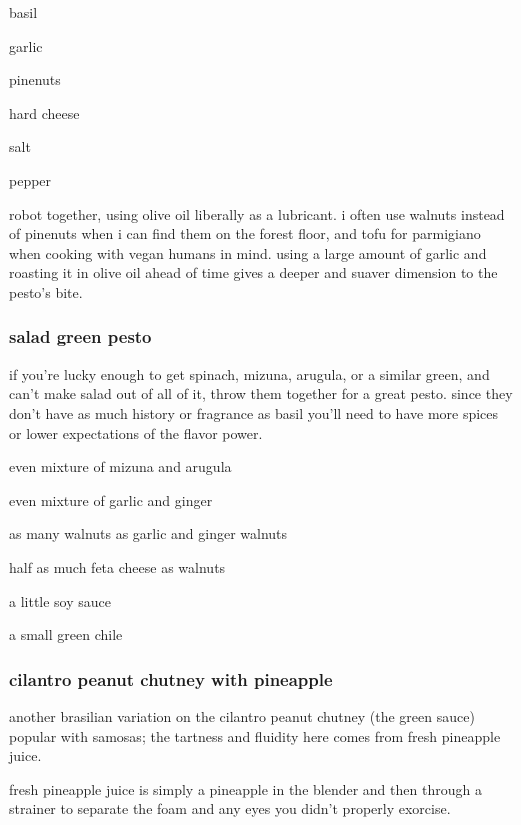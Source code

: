\begin{ingredients}
  \item basil
  \item garlic
  \item pinenuts
  \item hard cheese
  \item salt
  \item pepper
\end{ingredients}

robot together, using olive oil liberally as a lubricant. i often use walnuts 
instead of pinenuts when i can find them on the forest floor, and tofu for 
parmigiano when cooking with vegan humans in mind. using a large amount of 
garlic and roasting it in olive oil ahead of time gives a deeper and suaver 
dimension to the pesto's bite.

\subsubsection{salad green pesto}

if you're lucky enough to get spinach, mizuna, arugula, or a similar green, and 
can't make salad out of all of it, throw them together for a great pesto. since 
they don't have as much history or fragrance as basil you'll need to have more 
spices or lower expectations of the flavor power.

\begin{ingredients}
  \item even mixture of mizuna and arugula
  \item even mixture of garlic and ginger
  \item as many walnuts as garlic and ginger walnuts
  \item half as much feta cheese as walnuts
  \item a little soy sauce
  \item a small green chile
\end{ingredients}

\subsubsection{cilantro peanut chutney with pineapple}

another brasilian variation on the cilantro peanut chutney (the green sauce) 
popular with samosas; the tartness and fluidity here comes from fresh pineapple 
juice.

fresh pineapple juice is simply a pineapple in the blender and then through a 
strainer to separate the foam and any eyes you didn't properly exorcise.

